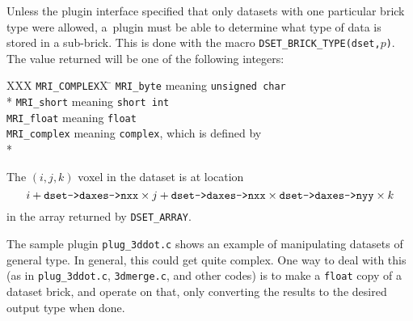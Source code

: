   Unless the plugin interface specified that only datasets with one particular
  brick type were allowed, a~plugin must be able to determine what
  type of data is stored in a sub-brick.  This is done with the
  macro {\tt DSET\_BRICK\_TYPE(dset,$p$)}.  The value returned will
  be one of the following integers:
\begin{tabbing}
   XXX \= {\tt MRI\_COMPLEX}X \= \kill
       \> {\tt MRI\_byte}     \> meaning {\tt unsigned char} \\*
       \> {\tt MRI\_short}    \> meaning {\tt short int} \\
       \> {\tt MRI\_float}    \> meaning {\tt float} \\
       \> {\tt MRI\_complex}  \> meaning {\tt complex}, which is defined by \\*
                            \>\> 
\end{tabbing}
  The $(i,j,k)$ voxel in the dataset is at location
  $$i + \hbox{\tt dset->daxes->nxx} \times j +
        \hbox{\tt dset->daxes->nxx} \times \hbox{\tt dset->daxes->nyy} \times k$$
  in the array returned by {\tt DSET\_ARRAY}.

  The sample plugin {\tt plug\_3ddot.c} shows an example of manipulating
  datasets of general type.  In general, this could get quite complex.
  One way to deal with this (as in {\tt plug\_3ddot.c}, {\tt 3dmerge.c}, and
  other codes) is to make
  a {\tt float} copy of a dataset brick, and operate on that, only converting
  the results to the desired output type when done.

\newcommand{\tb}[2]{\parbox[t]{4.0in}{\sloppy ({\tt #1}):~#2}}

